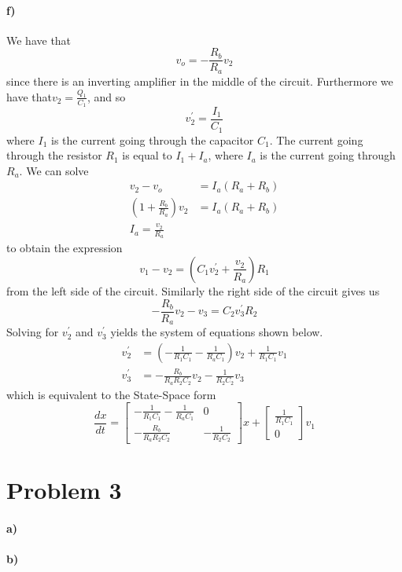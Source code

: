 \documentclass[12pt]{article}
\begin{document}
\paragraph{f)}

We have that
\[v_o = -\frac{R_b}{R_a}v_2\]
since there is an inverting amplifier in the middle
of the circuit. Furthermore we have that\(v_2 = \frac{Q_1}{C_1}\), and so
\[v_2^\prime = \frac{I_1}{C_1}\]
where \(I_1\) is the current going through the capacitor \(C_1\). The current going through the
resistor \(R_1\) is equal to \(I_1 + I_a\), where \(I_a\) is the current going through \(R_a\). We can solve
\begin{align*}
    v_2-v_o &= I_a(R_a+R_b)\\
    \left(1+\frac{R_b}{R_a}\right)v_2&=I_a(R_a+R_b)\\
    I_a=\frac{v_2}{R_a}
\end{align*}
to obtain the expression
\[v_1-v_2 = \left(C_1v_2^\prime + \frac{v_2}{R_a}\right)R_1\]
from the left side of the circuit. Similarly the right side of
the circuit gives us
\[-\frac{R_b}{R_a}v_2-v_3 = C_2v_3^\prime R_2\]
Solving for \(v_2^\prime\) and \(v_3^\prime\) yields the system of equations shown below.
\begin{align*}
    v_2^\prime &=\left(-\frac{1}{R_1C_1}-\frac{1}{R_aC_1}\right)v_2 + \frac{1}{R_1C_1}v_1\\
    v_3^\prime &=-\frac{R_b}{R_aR_2C_2}v_2-\frac{1}{R_2C_2}v_3
\end{align*}
which is equivalent to the State-Space form
\[\frac{dx}{dt}=\begin{bmatrix}
    -\frac{1}{R_1C_1}-\frac{1}{R_aC_1} & 0\\
    -\frac{R_b}{R_aR_2C_2} & -\frac{1}{R_2C_2}
\end{bmatrix}x + \begin{bmatrix}
    \frac{1}{R_1C_1}\\
    0
\end{bmatrix}v_1\]

\section*{Problem 3}

\paragraph{a)}

\paragraph{b)}
\end{document}
